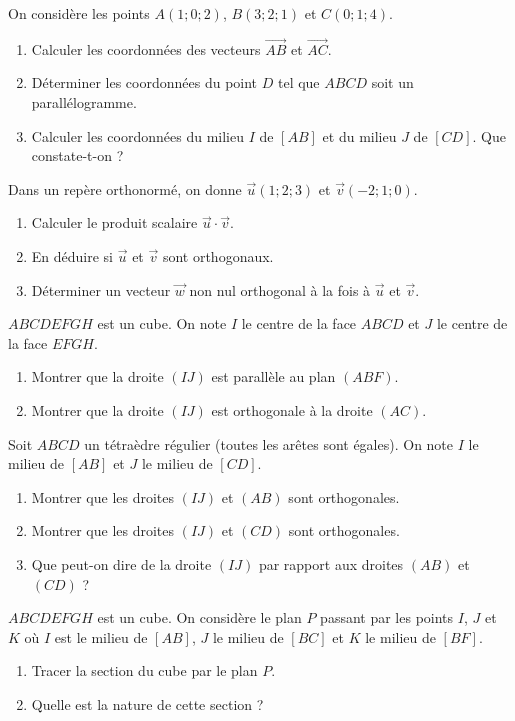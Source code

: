 \exo{}
On considère les points $A(1;0;2)$, $B(3;2;1)$ et $C(0;1;4)$.
\begin{enumerate}[label=\alph*)]
\item Calculer les coordonnées des vecteurs $\overrightarrow{AB}$ et $\overrightarrow{AC}$.
\item Déterminer les coordonnées du point $D$ tel que $ABCD$ soit un parallélogramme.
\item Calculer les coordonnées du milieu $I$ de $[AB]$ et du milieu $J$ de $[CD]$. Que constate-t-on ?
\end{enumerate}

\exo{}
Dans un repère orthonormé, on donne $\vec{u}(1;2;3)$ et $\vec{v}(-2;1;0)$.
\begin{enumerate}[label=\alph*)]
\item Calculer le produit scalaire $\vec{u}\cdot\vec{v}$.
\item En déduire si $\vec{u}$ et $\vec{v}$ sont orthogonaux.
\item Déterminer un vecteur $\vec{w}$ non nul orthogonal à la fois à $\vec{u}$ et $\vec{v}$.
\end{enumerate}


\exo{}
$ABCDEFGH$ est un cube. On note $I$ le centre de la face $ABCD$ et $J$ le centre de la face $EFGH$.
\begin{enumerate}[label=\alph*)]
\item Montrer que la droite $(IJ)$ est parallèle au plan $(ABF)$.
\item Montrer que la droite $(IJ)$ est orthogonale à la droite $(AC)$.
\end{enumerate}

\exo{}
Soit $ABCD$ un tétraèdre régulier (toutes les arêtes sont égales). On note $I$ le milieu de $[AB]$ et $J$ le milieu de $[CD]$.
\begin{enumerate}[label=\alph*)]
\item Montrer que les droites $(IJ)$ et $(AB)$ sont orthogonales.
\item Montrer que les droites $(IJ)$ et $(CD)$ sont orthogonales.
\item Que peut-on dire de la droite $(IJ)$ par rapport aux droites $(AB)$ et $(CD)$ ?
\end{enumerate}


\exo{}
$ABCDEFGH$ est un cube. On considère le plan $P$ passant par les points $I$, $J$ et $K$ où $I$ est le milieu de $[AB]$, $J$ le milieu de $[BC]$ et $K$ le milieu de $[BF]$.
\begin{enumerate}[label=\alph*)]
\item Tracer la section du cube par le plan $P$.
\item Quelle est la nature de cette section ?
\end{enumerate}

